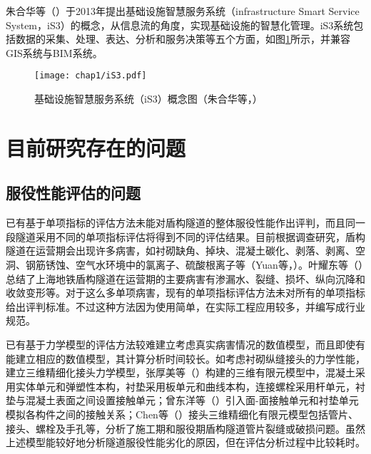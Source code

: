 朱合华等（\citeyear{朱合华2018智慧基础设施}）于2013年提出基础设施智慧服务系统（infrastructure Smart Service System，iS3）的概念，从信息流的角度，实现基础设施的智慧化管理。iS3系统包括数据的采集、处理、表达、分析和服务决策等五个方面，如图\ref{fig:iS3概念图}所示，并兼容GIS系统与BIM系统。

\begin{figure}[!h]
	\centering
	\texttt{[image: chap1/iS3.pdf]}
	\caption{基础设施智慧服务系统（iS3）概念图（朱合华等，\citeyear{朱合华2018智慧基础设施}）}
	\label{fig:iS3概念图}
\end{figure}

\section{目前研究存在的问题}

\subsection{服役性能评估的问题}

已有基于单项指标的评估方法未能对盾构隧道的整体服役性能作出评判，而且同一段隧道采用不同的单项指标评估将得到不同的评估结果。目前根据调查研究，盾构隧道在运营期会出现许多病害，如衬砌缺角、掉块、混凝土碳化、剥落、剥离、空洞、钢筋锈蚀、空气水环境中的氯离子、硫酸根离子等（Yuan等，\citeyear{yuan2013predictive}）。叶耀东等（\citeyear{叶耀东2007软土地铁运营隧道病害现状及成因分析}）总结了上海地铁盾构隧道在运营期的主要病害有渗漏水、裂缝、损坏、纵向沉降和收敛变形等。对于这么多单项病害，现有的单项指标评估方法未对所有的单项指标给出评判标准。不过这种方法因为使用简单，在实际工程应用较多，并编写成行业规范。

已有基于力学模型的评估方法较难建立考虑真实病害情况的数值模型，而且即使有能建立相应的数值模型，其计算分析时间较长。如考虑衬砌纵缝接头的力学性能，建立三维精细化接头力学模型，张厚美等（\citeyear{张厚美2000圆形隧道装配式衬砌接头刚度模型研究}）构建的三维有限元模型中，混凝土采用实体单元和弹塑性本构，衬垫采用板单元和曲线本构，连接螺栓采用杆单元，衬垫与混凝土表面之间设置接触单元；曾东洋等（\citeyear{曾东洋2005地铁盾构隧道管片接头刚度影响因素研究}）引入面-面接触单元和衬垫单元模拟各构件之间的接触关系；Chen等（\citeyear{chen2009numerical}）接头三维精细化有限元模型包括管片、接头、螺栓及手孔等，分析了施工期和服役期盾构隧道管片裂缝或破损问题。虽然上述模型能较好地分析隧道服役性能劣化的原因，但在评估分析过程中比较耗时。


